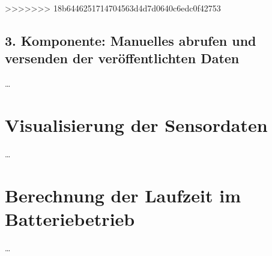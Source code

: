 \newpage
>>>>>>> 18b6446251714704563d4d7d0640c6edc0f42753

\subsection{3. Komponente: Manuelles abrufen und versenden der veröffentlichten Daten} \label{PubSub}

\ldots


\section{Visualisierung der Sensordaten} \label{Dashboard und Visualisierung}

\ldots


\section{Berechnung der Laufzeit im Batteriebetrieb} \label{Simulation}

\ldots
